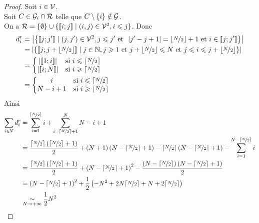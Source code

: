 \begin{proof}
	Soit $i \in \mathcal{V}$. \\
	Soit $C \in \mathcal{G}_i \cap \mathcal{R}$ telle que $C \setminus \{i\} \notin \mathcal{G}$. \\
	On a $\mathcal{R} = \{\emptyset\} \cup \{ [\![i;j]\!] \;|\; (i, j) \in \mathcal{V}^2, i \leqslant j \}$. Donc
	\begin{align*}
		d_i^r
		&= \left| \left\{ [\![j;j']\!] \;|\; (j, j') \in \V^2, j \leqslant j' \text{ et } |j' - j + 1| = \lfloor \nicefrac{N}{2} \rfloor + 1 \text{ et } i \in [\![j;j']\!] \right\} \right| \\
		&= \left| \left\{ [\![ j ; j + \lfloor\nicefrac{N}{2}\rfloor ]\!] \;|\; j \in \mathbb{N}, j \geqslant 1 \text{ et } j + \lfloor\nicefrac{N}{2}\rfloor \leqslant N \text{ et } j \leqslant i \leqslant j + \lfloor\nicefrac{N}{2}\rfloor \right\} \right| \\
		&= \left\{ \begin{matrix}
			| [\![1;i]\!] | & \text{si } i \leqslant \lceil\nicefrac{N}{2}\rceil \\
			| [\![i;N]\!] | & \text{si } i \geqslant \lceil\nicefrac{N}{2}\rceil \\
		\end{matrix} \right. \\
		&= \left\{ \begin{matrix}
			i & \text{si } i \leqslant \lceil\nicefrac{N}{2}\rceil \\
			N - i + 1 & \text{si } i \geqslant \lceil\nicefrac{N}{2}\rceil \\
		\end{matrix} \right. \\
	\end{align*}
	Ainsi
	\begin{align*}
		\sum_{i \in \mathcal{V}} d_i^r
		&= \sum_{i = 1}^{\lceil\nicefrac{N}{2}\rceil} i + \sum_{i = \lceil\nicefrac{N}{2}\rceil + 1}^{N} N - i + 1 \\
		&= \frac{\lceil\nicefrac{N}{2}\rceil \left( \lceil\nicefrac{N}{2}\rceil + 1 \right)}{2} + (N + 1) \left(N - \lceil\nicefrac{N}{2}\rceil + 1\right) - \lceil\nicefrac{N}{2}\rceil \left( N - \lceil\nicefrac{N}{2}\rceil + 1\right) - \sum_{i = 1}^{N - \lceil\nicefrac{N}{2}\rceil} i \\
		&= \frac{\lceil\nicefrac{N}{2}\rceil \left( \lceil\nicefrac{N}{2}\rceil + 1 \right)}{2} + \left(N-\lceil\nicefrac{N}{2}\rceil+1\right)^2 - \frac{\left(N-\lceil\nicefrac{N}{2}\rceil\right) \left(N-\lceil\nicefrac{N}{2}\rceil+1\right)}{2} \\
		&= \left(N-\lceil\nicefrac{N}{2}\rceil+1\right)^2 + \frac{1}{2} \left( - N^2 + 2 N \lceil\nicefrac{N}{2}\rceil + N + 2 \lceil\nicefrac{N}{2}\rceil \right) \\
		&\underset{N \rightarrow +\infty}{\sim} \frac{1}{2} N^2
	\end{align*}
\end{proof}

